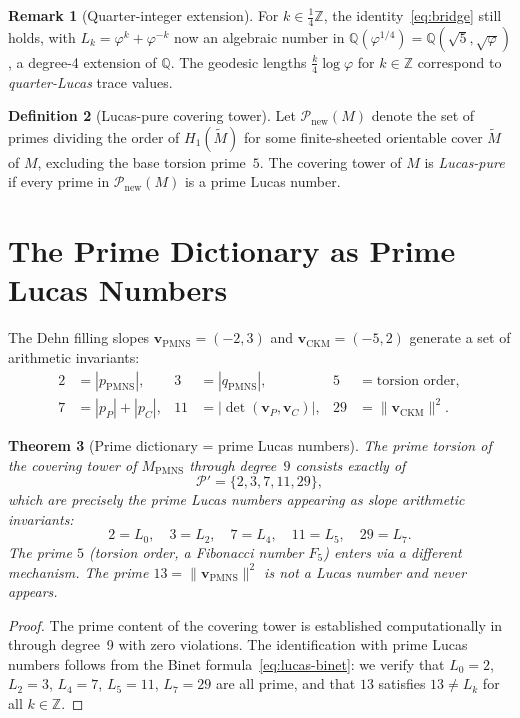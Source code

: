 \documentclass[12pt]{article}
\newtheorem{theorem}{Theorem}
\theoremstyle{definition}
\newtheorem{definition}[theorem]{Definition}
\newtheorem{remark}[theorem]{Remark}
\newcommand{\Z}{\mathbb{Z}}
\newcommand{\Q}{\mathbb{Q}}
\newcommand{\ph}{\varphi}
\newcommand{\logph}{\log\ph}
\begin{document}
\begin{remark}[Quarter-integer extension]
For $k \in \frac{1}{4}\Z$, the identity~\eqref{eq:bridge} still holds,
with $L_k = \ph^k + \ph^{-k}$ now an algebraic number in
$\Q(\ph^{1/4}) = \Q(\sqrt{5}, \sqrt{\ph})$, a degree-4 extension
of $\Q$. The geodesic lengths $\frac{k}{4}\logph$ for $k \in \Z$
correspond to \emph{quarter-Lucas} trace values.
\end{remark}


\begin{definition}[Lucas-pure covering tower]
\label{def:lucas-pure}
Let $\mathcal{P}_{\mathrm{new}}(M)$ denote the set of primes dividing
the order of $H_1(\widetilde{M})$ for some finite-sheeted orientable
cover $\widetilde{M}$ of $M$, excluding the base torsion prime~$5$.
The covering tower of $M$ is \emph{Lucas-pure} if every prime in
$\mathcal{P}_{\mathrm{new}}(M)$ is a prime Lucas number.
\end{definition}

\section{The Prime Dictionary as Prime Lucas Numbers}

The Dehn filling slopes $\mathbf{v}_{\mathrm{PMNS}} = (-2,3)$ and
$\mathbf{v}_{\mathrm{CKM}} = (-5,2)$ generate a set of arithmetic
invariants:
\begin{align}
  2 &= |p_{\mathrm{PMNS}}|, &
  3 &= |q_{\mathrm{PMNS}}|, &
  5 &= \text{torsion order},\\
  7 &= |p_P| + |p_C|, &
  11 &= |\det(\mathbf{v}_P, \mathbf{v}_C)|, &
  29 &= \|\mathbf{v}_{\mathrm{CKM}}\|^2.
\end{align}

\begin{theorem}[Prime dictionary = prime Lucas numbers]
\label{thm:lucas-dict}
The prime torsion of the covering tower of $M_{\mathrm{PMNS}}$
through degree~$9$ consists exactly of
\[
  \mathcal{P}' = \{2, 3, 7, 11, 29\},
\]
which are precisely the prime Lucas numbers appearing as slope
arithmetic invariants:
\[
  2 = L_0,\quad 3 = L_2,\quad 7 = L_4,\quad
  11 = L_5,\quad 29 = L_7.
\]
The prime $5$ (torsion order, a Fibonacci number $F_5$) enters
via a different mechanism. The prime $13 = \|\mathbf{v}_{\mathrm{PMNS}}\|^2$
is not a Lucas number and never appears.
\end{theorem}

\begin{proof}
The prime content of the covering tower is established computationally
in~\cite{gentry-covering} through degree~9 with zero violations.
The identification with prime Lucas numbers follows from the Binet
formula~\eqref{eq:lucas-binet}: we verify that $L_0=2$, $L_2=3$,
$L_4=7$, $L_5=11$, $L_7=29$ are all prime, and that $13$ satisfies
$13 \neq L_k$ for all $k \in \Z$.
\end{proof}
\end{document}
